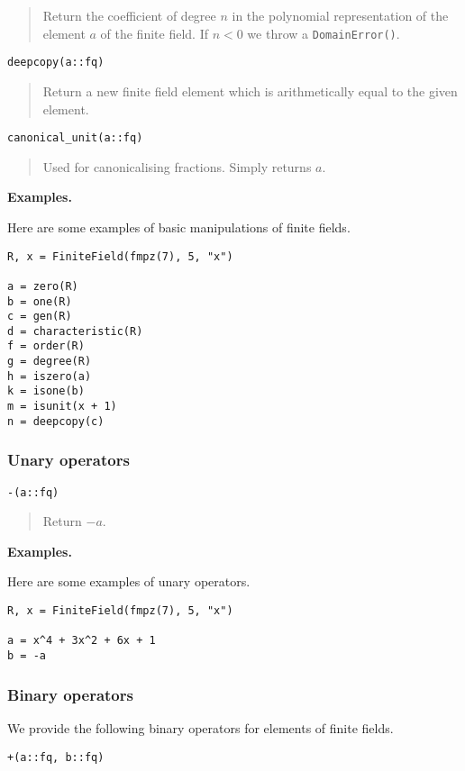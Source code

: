 \documentclass[a4paper,10pt]{article}
\newcommand{\code}{\lstinline}
\newcommand{\desc}[1]{\vspace{-3mm}\begin{quote}#1\end{quote}}
\begin{document}
{{\desc{Return the coefficient of degree $n$ in the polynomial representation
of the element $a$ of the finite field. If $n < 0$ we throw a
\code{DomainError()}.}

\begin{lstlisting}
deepcopy(a::fq)
\end{lstlisting}

\desc{Return a new finite field element which is arithmetically equal to
the given element.}

\begin{lstlisting}
canonical_unit(a::fq)
\end{lstlisting}

\desc{Used for canonicalising fractions. Simply returns $a$.}

\textbf{Examples.}

Here are some examples of basic manipulations of finite fields.

\begin{lstlisting}
R, x = FiniteField(fmpz(7), 5, "x")

a = zero(R)
b = one(R)
c = gen(R)
d = characteristic(R)
f = order(R)
g = degree(R)
h = iszero(a)
k = isone(b)
m = isunit(x + 1)
n = deepcopy(c)
\end{lstlisting}

\subsubsection{Unary operators}

\begin{lstlisting}
-(a::fq)
\end{lstlisting}

\desc{Return $-a$.}

\textbf{Examples.}

Here are some examples of unary operators.

\begin{lstlisting}
R, x = FiniteField(fmpz(7), 5, "x")

a = x^4 + 3x^2 + 6x + 1
b = -a
\end{lstlisting}

\subsubsection{Binary operators}

We provide the following binary operators for elements of
finite fields.

\begin{lstlisting}
+(a::fq, b::fq)
\end{lstlisting}

}}
\end{document}
